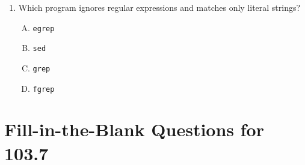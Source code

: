 \documentclass[a4paper]{report}
\begin{document}
\begin{enumerate}[1.]
    \item Which program ignores regular expressions and matches only literal strings?  
    \begin{enumerate}[A)]
        \item \texttt{egrep}  
        \item \texttt{sed}  
        \item \texttt{grep}  
        \item \texttt{fgrep}  
    \end{enumerate}

\end{enumerate}
\newpage
\section*{Fill-in-the-Blank Questions for 103.7}
\end{document}
